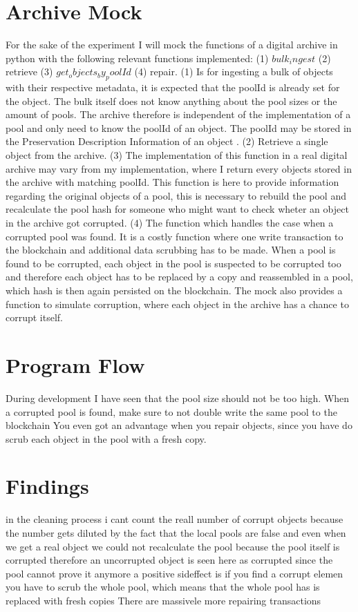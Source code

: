 \section{Archive Mock}
For the sake of the experiment I will mock the functions of a digital archive in python with the following relevant functions implemented: (1) $bulk_ingest$ (2) retrieve (3) $get_objects_by_poolId$ (4) repair. (1) Is for ingesting a bulk of objects with their respective metadata, it is expected that the poolId is already set for the object. The bulk itself does not know anything about the pool sizes or the amount of pools. The archive therefore is independent of the implementation of a pool and only need to know the poolId of an object. The poolId may be stored in the Preservation Description Information of an object \cite{lee2010open}. (2) Retrieve a single object from the archive. (3) The implementation of this function in a real digital archive may vary from my implementation, where I return every objects stored in the archive with matching poolId. This function is here to provide information regarding the original objects of a pool, this is necessary to rebuild the pool and recalculate the pool hash for someone who might want to check wheter an object in the archive got corrupted. (4) The function which handles the case when a corrupted pool was found. It is a costly function where one write transaction to the blockchain and additional data scrubbing has to be made. When a pool is found to be corrupted, each object in the pool is suspected to be corrupted too and therefore each object has to be replaced by a copy and reassembled in a pool, which hash is then again persisted on the blockchain.
The mock also provides a function to simulate corruption, where each object in the archive has a chance to corrupt itself.
\section{Program Flow}
During development I have seen that the pool size should not be too high.
When a corrupted pool is found, make sure to not double write the same pool to the blockchain
You even got an advantage when you repair objects, since you have do scrub each object in the pool with a fresh copy.
\section{Findings}
in the cleaning process i cant count the reall number of corrupt objects because the number gets diluted by the fact that the local pools are false and even when we get a real object we could not recalculate the pool because the pool itself is corrupted therefore an uncorrupted object is seen here as corrupted since the pool cannot prove it anymore
a positive sideffect is if you find a corrupt elemen you have to scrub the whole pool, which means that the whole pool has is replaced with fresh copies
There are massivele more repairing transactions

